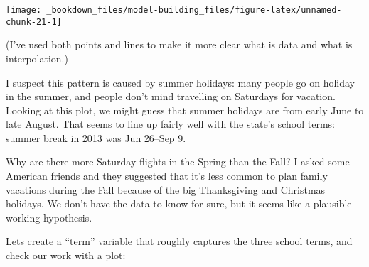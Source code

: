 \documentclass[]{book}
\newenvironment{Shaded}{\begin{snugshade}}{\end{snugshade}}
\newcommand{\KeywordTok}[1]{\textcolor[rgb]{0.13,0.29,0.53}{\textbf{{#1}}}}
\newcommand{\DataTypeTok}[1]{\textcolor[rgb]{0.13,0.29,0.53}{{#1}}}
\newcommand{\DecValTok}[1]{\textcolor[rgb]{0.00,0.00,0.81}{{#1}}}
\newcommand{\StringTok}[1]{\textcolor[rgb]{0.31,0.60,0.02}{{#1}}}
\newcommand{\OtherTok}[1]{\textcolor[rgb]{0.56,0.35,0.01}{{#1}}}
\newcommand{\NormalTok}[1]{{#1}}
\begin{document}
\begin{center}\texttt{[image: \_bookdown\_files/model-building\_files/figure-latex/unnamed-chunk-21-1]} \end{center}

(I've used both points and lines to make it more clear what is data and
what is interpolation.)

I suspect this pattern is caused by summer holidays: many people go on
holiday in the summer, and people don't mind travelling on Saturdays for
vacation. Looking at this plot, we might guess that summer holidays are
from early June to late August. That seems to line up fairly well with
the
\href{http://schools.nyc.gov/Calendar/2013-2014+School+Year+Calendars.htm}{state's
school terms}: summer break in 2013 was Jun 26--Sep 9.

Why are there more Saturday flights in the Spring than the Fall? I asked
some American friends and they suggested that it's less common to plan
family vacations during the Fall because of the big Thanksgiving and
Christmas holidays. We don't have the data to know for sure, but it
seems like a plausible working hypothesis.

Lets create a ``term'' variable that roughly captures the three school
terms, and check our work with a plot:

\begin{Shaded}
\end{Shaded}
\end{document}
